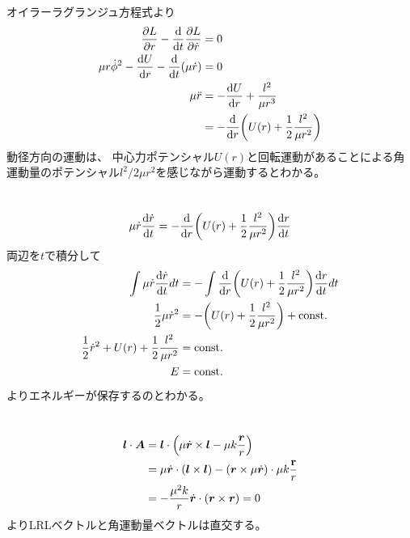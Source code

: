 \documentclass[../ap_2014.tex]{subfiles}
\begin{document}
\section{}
オイラーラグランジュ方程式より
\begin{equation}\begin{aligned}[b]
    \pdv{L}{r}-\dv{t}\pdv{L}{\dot{r}}&=0\\
    \mu r\dot{\phi}^2-\dv{U}{r}-\dv{t}(\mu \dot{r}) &=0\\
    \mu \ddot{r} &= -\dv{U}{r}+\frac{l^2}{\mu r^3}\\
    &= -\dv{r}\qty(U(r)+\frac{1}{2}\frac{l^2}{\mu r^2})
\end{aligned}\end{equation}
動径方向の運動は、
中心力ポテンシャル\(U(r)\)と回転運動があることによる角運動量のポテンシャル\(l^2/2\mu r^2\)を感じながら運動するとわかる。

\section{}
\begin{equation}\begin{aligned}[b]
    \mu \dot{r}\dv{\dot{r}}{t} = -\dv{r}\qty(U(r)+\frac{1}{2}\frac{l^2}{\mu r^2})\dv{r}{t}
\end{aligned}\end{equation}
両辺を\(t\)で積分して
\begin{equation}\begin{aligned}[b]
    \int \mu \dot{r}\dv{\dot{r}}{t}dt &= -\int \dv{r}\qty(U(r)+\frac{1}{2}\frac{l^2}{\mu r^2})\dv{r}{t}dt\\
    \frac{1}{2}\mu\dot{r}^2 &= -\qty(U(r)+\frac{1}{2}\frac{l^2}{\mu r^2})+\text{const.}\\
    \frac{1}{2}\dot{r}^2+U(r)+\frac{1}{2}\frac{l^2}{\mu r^2} &= \text{const.}\\
    E &= \text{const.}
\end{aligned}\end{equation}
よりエネルギーが保存するのとわかる。

\section{}
\begin{equation}\begin{aligned}[b]
    \vb*{l}\cdot \vb*{A} &= \vb*{l}\cdot\qty(\mu\dot{\vb*{r}}\times\vb*{l}-\mu k\frac{\vb*{r}}{r})\\
    &=\mu\dot{\vb*{r}}\cdot(\vb*{l}\times\vb*{l})-(\vb*{r}\times\mu\dot{\vb*{r}})\cdot\mu k\frac{\vb{r}}{r}\\
    &= -\frac{\mu^2 k}{r}\dot{\vb*{r}}\cdot(\vb*{r}\times\vb*{r}) = 0
\end{aligned}\end{equation}
よりLRLベクトルと角運動量ベクトルは直交する。
\end{document}
